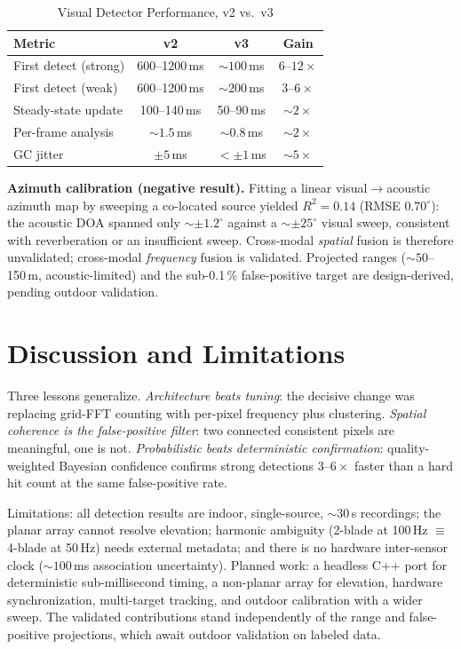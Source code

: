 \documentclass[conference]{IEEEtran}
\begin{document}
\begin{table}[t]
\caption{Visual Detector Performance, v2 vs.\ v3}
\label{tab:latency}
\centering
\begin{tabular}{@{}lccc@{}}
\toprule
\textbf{Metric} & \textbf{v2} & \textbf{v3} & \textbf{Gain} \\
\midrule
First detect (strong) & 600--1200\,ms & ${\sim}100$\,ms & $6$--$12\times$ \\
First detect (weak) & 600--1200\,ms & ${\sim}200$\,ms & $3$--$6\times$ \\
Steady-state update & 100--140\,ms & 50--90\,ms & ${\sim}2\times$ \\
Per-frame analysis & ${\sim}1.5$\,ms & ${\sim}0.8$\,ms & ${\sim}2\times$ \\
GC jitter & $\pm 5$\,ms & $<\pm 1$\,ms & ${\sim}5\times$ \\
\bottomrule
\end{tabular}
\end{table}

\textbf{Azimuth calibration (negative result).} Fitting a linear
visual$\rightarrow$acoustic azimuth map by sweeping a co-located source
yielded $R^2 = 0.14$ (RMSE $0.70^{\circ}$): the acoustic DOA spanned only
${\sim}\pm 1.2^{\circ}$ against a ${\sim}\pm 25^{\circ}$ visual sweep,
consistent with reverberation or an insufficient sweep. Cross-modal
\emph{spatial} fusion is therefore unvalidated; cross-modal \emph{frequency}
fusion is validated. Projected ranges (${\sim}50$--150\,m,
acoustic-limited) and the sub-0.1\,\% false-positive target are
design-derived, pending outdoor validation.

\section{Discussion and Limitations}
Three lessons generalize. \emph{Architecture beats tuning}: the decisive
change was replacing grid-FFT counting with per-pixel frequency plus
clustering. \emph{Spatial coherence is the false-positive filter}: two
connected consistent pixels are meaningful, one is not.
\emph{Probabilistic beats deterministic confirmation}: quality-weighted
Bayesian confidence confirms strong detections $3$--$6\times$ faster than a
hard hit count at the same false-positive rate.

Limitations: all detection results are indoor, single-source,
${\sim}30$\,s recordings; the planar array cannot resolve elevation;
harmonic ambiguity (2-blade at 100\,Hz $\equiv$ 4-blade at 50\,Hz) needs
external metadata; and there is no hardware inter-sensor clock
(${\sim}100$\,ms association uncertainty). Planned work: a headless C++
port for deterministic sub-millisecond timing, a non-planar array for
elevation, hardware synchronization, multi-target tracking, and outdoor
calibration with a wider sweep. The validated contributions stand
independently of the range and false-positive projections, which await
outdoor validation on labeled data.
\end{document}
